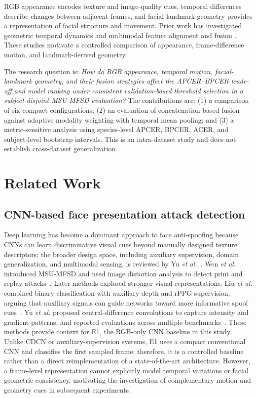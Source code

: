 \documentclass[a4paper,conference]{IEEEtran}
\begin{document}
RGB appearance encodes texture and image-quality cues, temporal differences describe changes between adjacent frames, and facial landmark geometry provides a representation of facial structure and movement. Prior work has investigated geometric temporal dynamics \cite{chang2023geometry} and multimodal feature alignment and fusion \cite{chen2025mmfas}. These studies motivate a controlled comparison of appearance, frame-difference motion, and landmark-derived geometry.

The research question is: \emph{How do RGB appearance, temporal motion, facial-landmark geometry, and their fusion strategies affect the APCER--BPCER trade-off and model ranking under consistent validation-based threshold selection in a subject-disjoint MSU-MFSD evaluation?} The contributions are: (1) a comparison of six compact configurations; (2) an evaluation of concatenation-based fusion against adaptive modality weighting with temporal mean pooling; and (3) a metric-sensitive analysis using species-level APCER, BPCER, ACER, and subject-level bootstrap intervals. This is an intra-dataset study and does not establish cross-dataset generalization.

\section{Related Work}
\subsection{CNN-based face presentation attack detection}
Deep learning has become a dominant approach to face anti-spoofing because CNNs can learn discriminative visual cues beyond manually designed texture descriptors; the broader design space, including auxiliary supervision, domain generalization, and multimodal sensing, is reviewed by Yu \emph{et al.}~\cite{yu2023survey}. Wen \emph{et al.} introduced MSU-MFSD and used image distortion analysis to detect print and replay attacks~\cite{wen2015ida}. Later methods explored stronger visual representations. Liu \emph{et al.} combined binary classification with auxiliary depth and rPPG supervision, arguing that auxiliary signals can guide networks toward more informative spoof cues~\cite{liu2018aux}. Yu \emph{et al.} proposed central-difference convolutions to capture intensity and gradient patterns, and reported evaluations across multiple benchmarks~\cite{yu2020cdcn}. These methods provide context for E1, the RGB-only CNN baseline in this study. Unlike CDCN or auxiliary-supervision systems, E1 uses a compact conventional CNN and classifies the first sampled frame; therefore, it is a controlled baseline rather than a direct reimplementation of a state-of-the-art architecture. However, a frame-level representation cannot explicitly model
temporal variations or facial geometric consistency, motivating
the investigation of complementary motion and geometry cues
in subsequent experiments.
\end{document}

